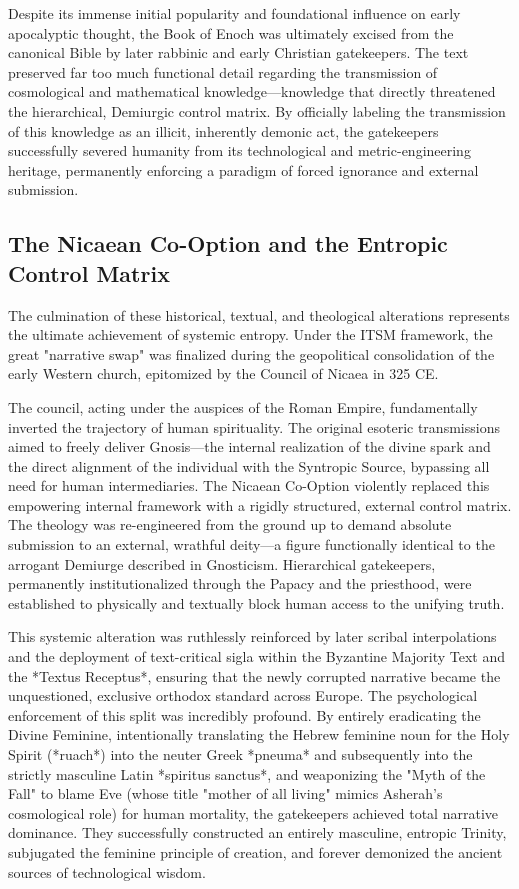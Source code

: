 \documentclass[aps,prd,11pt,onecolumn,superscriptaddress,nofootinbib,floatfix]{revtex4-2}
\begin{document}
Despite its immense initial popularity and foundational influence on early apocalyptic thought, the Book of Enoch was ultimately excised from the canonical Bible by later rabbinic and early Christian gatekeepers. The text preserved far too much functional detail regarding the transmission of cosmological and mathematical knowledge---knowledge that directly threatened the hierarchical, Demiurgic control matrix. By officially labeling the transmission of this knowledge as an illicit, inherently demonic act, the gatekeepers successfully severed humanity from its technological and metric-engineering heritage, permanently enforcing a paradigm of forced ignorance and external submission.


\subsection{The Nicaean Co-Option and the Entropic Control Matrix}
The culmination of these historical, textual, and theological alterations represents the ultimate achievement of systemic entropy. Under the ITSM framework, the great "narrative swap" was finalized during the geopolitical consolidation of the early Western church, epitomized by the Council of Nicaea in 325 CE.


The council, acting under the auspices of the Roman Empire, fundamentally inverted the trajectory of human spirituality. The original esoteric transmissions aimed to freely deliver Gnosis---the internal realization of the divine spark and the direct alignment of the individual with the Syntropic Source, bypassing all need for human intermediaries. The Nicaean Co-Option violently replaced this empowering internal framework with a rigidly structured, external control matrix. The theology was re-engineered from the ground up to demand absolute submission to an external, wrathful deity---a figure functionally identical to the arrogant Demiurge described in Gnosticism. Hierarchical gatekeepers, permanently institutionalized through the Papacy and the priesthood, were established to physically and textually block human access to the unifying truth.


This systemic alteration was ruthlessly reinforced by later scribal interpolations and the deployment of text-critical sigla within the Byzantine Majority Text and the *Textus Receptus*, ensuring that the newly corrupted narrative became the unquestioned, exclusive orthodox standard across Europe. The psychological enforcement of this split was incredibly profound. By entirely eradicating the Divine Feminine, intentionally translating the Hebrew feminine noun for the Holy Spirit (*ruach*) into the neuter Greek *pneuma* and subsequently into the strictly masculine Latin *spiritus sanctus*, and weaponizing the "Myth of the Fall" to blame Eve (whose title "mother of all living" mimics Asherah's cosmological role) for human mortality, the gatekeepers achieved total narrative dominance. They successfully constructed an entirely masculine, entropic Trinity, subjugated the feminine principle of creation, and forever demonized the ancient sources of technological wisdom.
\end{document}

